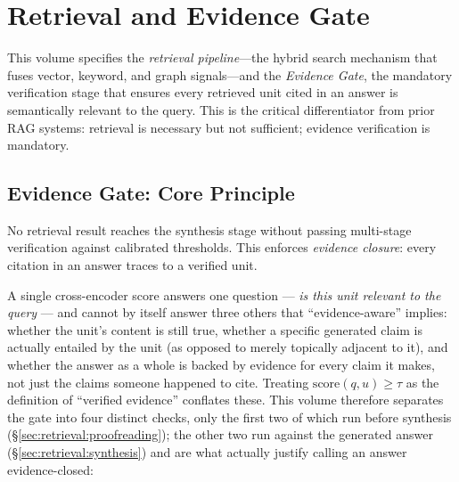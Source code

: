 \chapter{Retrieval and Evidence Gate}
\label{cha:retrieval}

This volume specifies the \emph{retrieval pipeline}---the hybrid search mechanism that fuses vector, keyword, and graph signals---and the \emph{Evidence Gate}, the mandatory verification stage that ensures every retrieved unit cited in an answer is semantically relevant to the query. This is the critical differentiator from prior RAG systems: retrieval is necessary but not sufficient; evidence verification is mandatory.

\section{Evidence Gate: Core Principle}
\label{sec:retrieval:evidence-gate}

\begin{designprinciple}
No retrieval result reaches the synthesis stage without passing multi-stage verification against calibrated thresholds. This enforces \emph{evidence closure}: every citation in an answer traces to a verified unit.
\end{designprinciple}

A single cross-encoder score answers one question --- \emph{is this unit relevant to the query} --- and cannot by itself answer three others that ``evidence-aware'' implies: whether the unit's content is still true, whether a specific generated claim is actually entailed by the unit (as opposed to merely topically adjacent to it), and whether the answer as a whole is backed by evidence for every claim it makes, not just the claims someone happened to cite. Treating $\text{score}(q,u) \geq \tau$ as the definition of ``verified evidence'' conflates these. This volume therefore separates the gate into four distinct checks, only the first two of which run before synthesis (\S\ref{sec:retrieval:proofreading}); the other two run against the generated answer (\S\ref{sec:retrieval:synthesis}) and are what actually justify calling an answer evidence-closed:

